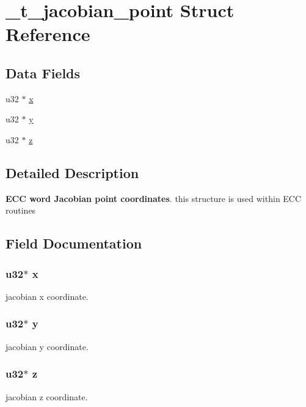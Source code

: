 \hypertarget{struct__t__jacobian__point}{\section{\+\_\+t\+\_\+jacobian\+\_\+point Struct Reference}
\label{struct__t__jacobian__point}
}
\subsection*{Data Fields}
\begin{DoxyCompactItemize}
\item 
u32 $\ast$ \hyperlink{struct__t__jacobian__point_afb22ef172fe0d1819b8a567bc4f9d0a8}{x}
\item 
u32 $\ast$ \hyperlink{struct__t__jacobian__point_a7c48a39466ef1e0a5be106b297e920b5}{y}
\item 
u32 $\ast$ \hyperlink{struct__t__jacobian__point_a48e8ffec6ab90e777406760e2dd11aa3}{z}
\end{DoxyCompactItemize}


\subsection{Detailed Description}
{\bfseries E\+C\+C word Jacobian point coordinates}. this structure is used within E\+C\+C routines 

\subsection{Field Documentation}
\hypertarget{struct__t__jacobian__point_afb22ef172fe0d1819b8a567bc4f9d0a8}{
\subsubsection[{x}]{\setlength{\rightskip}{0pt plus 5cm}u32$\ast$ x}}\label{struct__t__jacobian__point_afb22ef172fe0d1819b8a567bc4f9d0a8}
jacobian x coordinate. \hypertarget{struct__t__jacobian__point_a7c48a39466ef1e0a5be106b297e920b5}{
\subsubsection[{y}]{\setlength{\rightskip}{0pt plus 5cm}u32$\ast$ y}}\label{struct__t__jacobian__point_a7c48a39466ef1e0a5be106b297e920b5}
jacobian y coordinate. \hypertarget{struct__t__jacobian__point_a48e8ffec6ab90e777406760e2dd11aa3}{
\subsubsection[{z}]{\setlength{\rightskip}{0pt plus 5cm}u32$\ast$ z}}\label{struct__t__jacobian__point_a48e8ffec6ab90e777406760e2dd11aa3}
jacobian z coordinate. 